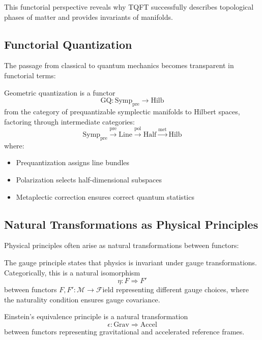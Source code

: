 This functorial perspective reveals why TQFT successfully describes topological phases of matter and provides invariants of manifolds.

\subsection{Functorial Quantization}

The passage from classical to quantum mechanics becomes transparent in functorial terms:

\begin{definition}
Geometric quantization is a functor
\[
\text{GQ}: \text{Symp}_{\text{pre}} \to \text{Hilb}
\]
from the category of prequantizable symplectic manifolds to Hilbert spaces, factoring through intermediate categories:
\[
\text{Symp}_{\text{pre}} \xrightarrow{\text{pre}} \text{Line} \xrightarrow{\text{pol}} \text{Half} \xrightarrow{\text{met}} \text{Hilb}
\]
where:
\begin{itemize}
\item Prequantization assigns line bundles
\item Polarization selects half-dimensional subspaces
\item Metaplectic correction ensures correct quantum statistics
\end{itemize}
\end{definition}

\subsection{Natural Transformations as Physical Principles}

Physical principles often arise as natural transformations between functors:

\begin{example}
The gauge principle states that physics is invariant under gauge transformations. Categorically, this is a natural isomorphism
\[
\eta: F \Rightarrow F'
\]
between functors $F, F': \mathcal{M} \to \mathcal{F}\text{ield}$ representing different gauge choices, where the naturality condition ensures gauge covariance.
\end{example}

\begin{example}
Einstein's equivalence principle is a natural transformation
\[
\epsilon: \text{Grav} \Rightarrow \text{Accel}
\]
between functors representing gravitational and accelerated reference frames.
\end{example}

